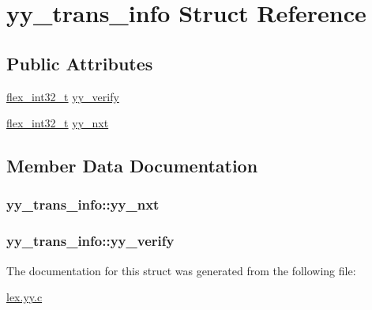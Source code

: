 \hypertarget{structyy__trans__info}{}\section{yy\+\_\+trans\+\_\+info Struct Reference}
\label{structyy__trans__info}
\subsection*{Public Attributes}
\begin{DoxyCompactItemize}
\item 
\hyperlink{lex_8yy_8c_a838ce943cf44ef7769480714fc6c3ba9}{flex\+\_\+int32\+\_\+t} \hyperlink{structyy__trans__info_a5c9f61e770deef50bd4e697310342fe9}{yy\+\_\+verify}
\item 
\hyperlink{lex_8yy_8c_a838ce943cf44ef7769480714fc6c3ba9}{flex\+\_\+int32\+\_\+t} \hyperlink{structyy__trans__info_ae0715250c2bef261e596e77e0030f13e}{yy\+\_\+nxt}
\end{DoxyCompactItemize}


\subsection{Member Data Documentation}
\subsubsection[{\texorpdfstring{yy\+\_\+nxt}{yy_nxt}}]{ yy\+\_\+trans\+\_\+info\+::yy\+\_\+nxt}\hypertarget{structyy__trans__info_ae0715250c2bef261e596e77e0030f13e}{}\label{structyy__trans__info_ae0715250c2bef261e596e77e0030f13e}
\subsubsection[{\texorpdfstring{yy\+\_\+verify}{yy_verify}}]{ yy\+\_\+trans\+\_\+info\+::yy\+\_\+verify}\hypertarget{structyy__trans__info_a5c9f61e770deef50bd4e697310342fe9}{}\label{structyy__trans__info_a5c9f61e770deef50bd4e697310342fe9}


The documentation for this struct was generated from the following file\+:\begin{DoxyCompactItemize}
\item 
\hyperlink{lex_8yy_8c}{lex.\+yy.\+c}\end{DoxyCompactItemize}
